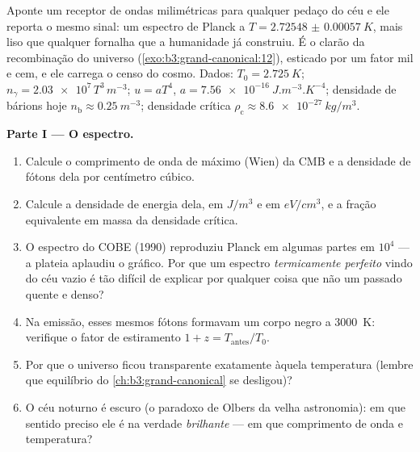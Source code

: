 \begin{problem}\label{pb:b3:photons-phonons:1}
Aponte um receptor de ondas milimétricas para qualquer pedaço do céu e
ele reporta o mesmo sinal: um espectro de Planck a $T =
\qty{2.72548(57)}{K}$, mais liso que qualquer fornalha que a humanidade
já construiu. É o clarão da recombinação do universo
(\cref{exo:b3:grand-canonical:12}), esticado por um fator mil e cem,
e ele carrega o censo do cosmo. Dados: $T_0 =
\qty{2.725}{K}$; $n_\gamma = \num{2.03e7}\,T^3\,\unit{m^{-3}}$;
$u = aT^4$, $a = \qty{7.56e-16}{J.m^{-3}.K^{-4}}$; densidade de bárions
hoje $n_{\text{b}} \approx \qty{0.25}{m^{-3}}$; densidade crítica
$\rho_{\text{c}} \approx \qty{8.6e-27}{kg/m^3}$.

\medskip\noindent\textbf{Parte I --- O espectro.}
\begin{enumerate}
  \item Calcule o comprimento de onda de máximo (Wien) da CMB e a
        densidade de fótons dela por centímetro cúbico.
  \item Calcule a densidade de energia dela, em $\unit{J/m^3}$ e em
        $\unit{eV/cm^3}$, e a fração equivalente em massa da
        densidade crítica.
  \item O espectro do COBE (1990) reproduziu Planck em algumas partes em
        $10^4$ --- a plateia aplaudiu o gráfico. Por que um espectro
        \emph{termicamente perfeito} vindo do céu vazio é tão difícil de
        explicar por qualquer coisa que não um passado quente e denso?
  \item Na emissão, esses mesmos fótons formavam um corpo negro a
        \qty{3000}{K}: verifique o fator de estiramento $1 + z =
        T_{\text{antes}}/T_0$.
  \item Por que o universo ficou transparente exatamente àquela
        temperatura (lembre que equilíbrio do
        \cref{ch:b3:grand-canonical} se desligou)?
  \item O céu noturno é escuro (o paradoxo de Olbers da velha
        astronomia): em que sentido preciso ele é na verdade
        \emph{brilhante} --- em que comprimento de onda e temperatura?
\end{enumerate}


\end{problem}
